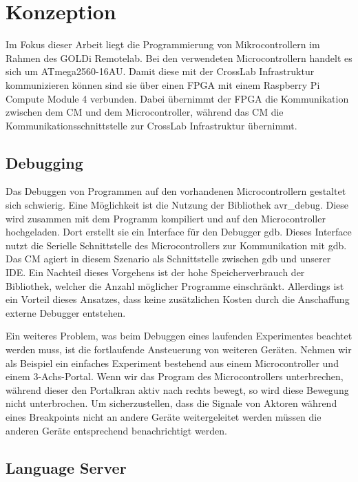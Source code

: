 \chapter{Konzeption} \label{konzeption}

Im Fokus dieser Arbeit liegt die Programmierung von Mikrocontrollern im Rahmen des GOLDi Remotelab. Bei den verwendeten Microcontrollern handelt es sich um ATmega2560-16AU. Damit diese mit der CrossLab Infrastruktur kommunizieren können sind sie über einen FPGA mit einem Raspberry Pi Compute Module 4 verbunden. Dabei übernimmt der FPGA die Kommunikation zwischen dem CM und dem Microcontroller, während das CM die Kommunikationsschnittstelle zur CrossLab Infrastruktur übernimmt.

\section{Debugging}

Das Debuggen von Programmen auf den vorhandenen Microcontrollern gestaltet sich schwierig. Eine Möglichkeit ist die Nutzung der Bibliothek avr\_debug. Diese wird zusammen mit dem Programm kompiliert und auf den Microcontroller hochgeladen. Dort erstellt sie ein Interface für den Debugger gdb. Dieses Interface nutzt die Serielle Schnittstelle des Microcontrollers zur Kommunikation mit gdb. Das CM agiert in diesem Szenario als Schnittstelle zwischen gdb und unserer IDE. Ein Nachteil dieses Vorgehens ist der hohe Speicherverbrauch der Bibliothek, welcher die Anzahl möglicher Programme einschränkt. Allerdings ist ein Vorteil dieses Ansatzes, dass keine zusätzlichen Kosten durch die Anschaffung externe Debugger entstehen.

Ein weiteres Problem, was beim Debuggen eines laufenden Experimentes beachtet werden muss, ist die fortlaufende Ansteuerung von weiteren Geräten. Nehmen wir als Beispiel ein einfaches Experiment bestehend aus einem Microcontroller und einem 3-Achs-Portal. Wenn wir das Program des Microcontrollers unterbrechen, während dieser den Portalkran aktiv nach rechts bewegt, so wird diese Bewegung nicht unterbrochen. Um sicherzustellen, dass die Signale von Aktoren während eines Breakpoints nicht an andere Geräte weitergeleitet werden müssen die anderen Geräte entsprechend benachrichtigt werden.

\section{Language Server}

